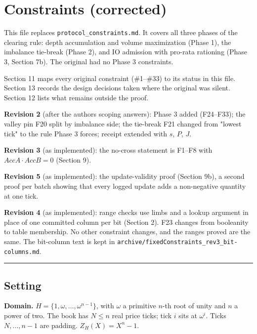 
\section{Constraints (corrected)}

This file replaces \texttt{protocol\_constraints.md}. It covers all three phases of the clearing rule: depth accumulation and volume maximization (Phase 1), the imbalance tie-break (Phase 2), and IO admission with pro-rata rationing (Phase 3, Section 7b). The original had no Phase 3 constraints.

Section 11 maps every original constraint (\#1--\#33) to its status in this file. Section 13 records the design decisions taken where the original was silent. Section 12 lists what remains outside the proof.

\textbf{Revision 2} (after the author\textquotesingle s scoping answers): Phase 3 added (F24--F33); the valley pin F20 split by imbalance side; the tie-break F21 changed from "lowest tick" to the rule Phase 3 forces; receipt extended with \(s\), \(P\), \(J\).

\textbf{Revision 3} (as implemented): the no-cross statement is F1--F8 with \(AccA \cdot AccB = 0\) (Section 9).

\textbf{Revision 5} (as implemented): the update-validity proof (Section 9b), a second proof per batch showing that every logged update adds a non-negative quantity at one tick.

\textbf{Revision 4} (as implemented): range checks use limbs and a lookup argument in place of one committed column per bit (Section 2). F23 changes from booleanity to table membership. No other constraint changes, and the ranges proved are the same. The bit-column text is kept in \texttt{archive/fixedConstraints\_rev3\_bit-columns.md}.

\begin{center}\rule{0.5\linewidth}{0.5pt}\end{center}

\subsection{Setting}

\textbf{Domain.} \(H = \{1, \omega, \ldots, \omega^{n-1}\}\), with \(\omega\) a primitive \(n\)-th root of unity and \(n\) a power of two. The book has \(N \le n\) real price ticks; tick \(i\) sits at \(\omega^i\). Ticks \(N, \ldots, n-1\) are padding. \(Z_H(X) = X^n - 1\).

